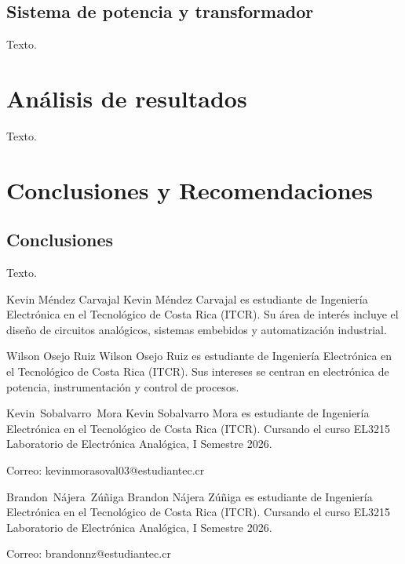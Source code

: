 \documentclass[journal]{IEEEtran}
\begin{document}
\subsection{Sistema de potencia y transformador}
Texto.

\section{Análisis de resultados}
Texto.

\section{Conclusiones y Recomendaciones}

\subsection{Conclusiones}
Texto.

\nocite{*}
\printbibliography

\begin{IEEEbiographynophoto}{Kevin Méndez Carvajal}
Kevin Méndez Carvajal es estudiante de Ingeniería Electrónica en el Tecnológico de
Costa Rica (ITCR). Su área de interés incluye el diseño de circuitos analógicos,
sistemas embebidos y automatización industrial.
\end{IEEEbiographynophoto}

\begin{IEEEbiographynophoto}{Wilson Osejo Ruiz}
Wilson Osejo Ruiz es estudiante de Ingeniería Electrónica en el Tecnológico de
Costa Rica (ITCR). Sus intereses se centran en electrónica de potencia,
instrumentación y control de procesos.
\end{IEEEbiographynophoto}

\begin{IEEEbiographynophoto}{Kevin~Sobalvarro~Mora}
Kevin Sobalvarro Mora es estudiante de Ingeniería Electrónica en el Tecnológico de
Costa Rica (ITCR). Cursando el curso EL3215 Laboratorio de Electrónica Analógica,
I Semestre 2026.

Correo: kevinmorasoval03@estudiantec.cr
\end{IEEEbiographynophoto}

\begin{IEEEbiographynophoto}{Brandon~Nájera~Zúñiga}
Brandon Nájera Zúñiga es estudiante de Ingeniería Electrónica en el Tecnológico de
Costa Rica (ITCR). Cursando el curso EL3215 Laboratorio de Electrónica Analógica,
I Semestre 2026.

Correo: brandonnz@estudiantec.cr
\end{IEEEbiographynophoto}

\vfill
\end{document}
